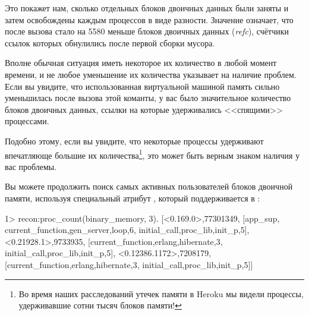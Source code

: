 \documentclass[11pt, oneside]{book}   	%
\begin{document}
Это покажет нам, сколько отдельных блоков двоичных данных были заняты и затем освобождены каждым процессов в виде разности. Значение  означает, что после вызова стало на 5580 меньше блоков двоичных данных (\emph{refc}), счётчики ссылок которых обнулились после первой сборки мусора.

Вполне обычная ситуация иметь некоторое их количество в любой момент времени, и не любое уменьшение их количества указывает на наличие проблем. Если вы увидите, что использованная виртуальной машиной память сильно уменьшилась после вызова этой команты, у вас было значительное количество блоков двоичных данных, ссылки на которые удерживались <<спящими>> процессами.

Подобно этому, если вы увидите, что некоторые процессы удерживают впечатляюще большие их количества\footnote{Во время наших расследований утечек памяти в Heroku мы видели процессы, удерживавшие сотни тысяч блоков памяти!}, это может быть верным знаком наличия у вас проблемы.

Вы можете продолжить поиск самых активных пользователей блоков двоичной памяти, используя специальный атрибут , который поддерживается в :

\begin{VerbatimEshell}
1> recon:proc_count(binary_memory, 3).
[{<0.169.0>,77301349,
  [app_sup,
   {current_function,{gen_server,loop,6}},
   {initial_call,{proc_lib,init_p,5}}]},
 {<0.21928.1>,9733935,
  [{current_function,{erlang,hibernate,3}},
   {initial_call,{proc_lib,init_p,5}}]},
 {<0.12386.1172>,7208179,
  [{current_function,{erlang,hibernate,3}},
   {initial_call,{proc_lib,init_p,5}}]}]
\end{VerbatimEshell}
\end{document}
